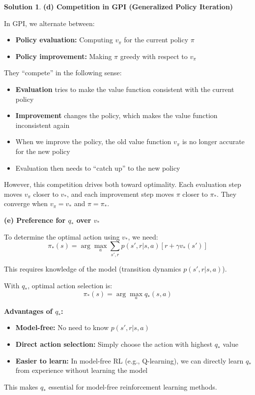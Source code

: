 \documentclass[11pt]{article}
\theoremstyle{definition}
\newtheorem*{solution}{Solution}
\begin{document}
\begin{solution}
\textbf{(d) Competition in GPI (Generalized Policy Iteration)}

In GPI, we alternate between:
\begin{itemize}
    \item \textbf{Policy evaluation:} Computing $v_\pi$ for the current policy $\pi$
    \item \textbf{Policy improvement:} Making $\pi$ greedy with respect to $v_\pi$
\end{itemize}

They ``compete'' in the following sense:
\begin{itemize}
    \item \textbf{Evaluation} tries to make the value function consistent with the current policy
    \item \textbf{Improvement} changes the policy, which makes the value function inconsistent again
    \item When we improve the policy, the old value function $v_\pi$ is no longer accurate for the new policy
    \item Evaluation then needs to ``catch up'' to the new policy
\end{itemize}

However, this competition drives both toward optimality. Each evaluation step moves $v_\pi$ closer to $v_*$, and each improvement step moves $\pi$ closer to $\pi_*$. They converge when $v_\pi = v_*$ and $\pi = \pi_*$.

\textbf{(e) Preference for $q_*$ over $v_*$}

To determine the optimal action using $v_*$, we need:
\[
\pi_*(s) = \arg\max_a \sum_{s',r} p(s',r|s,a)[r + \gamma v_*(s')]
\]

This requires knowledge of the model (transition dynamics $p(s',r|s,a)$).

With $q_*$, optimal action selection is:
\[
\pi_*(s) = \arg\max_a q_*(s,a)
\]

\textbf{Advantages of $q_*$:}
\begin{itemize}
    \item \textbf{Model-free:} No need to know $p(s',r|s,a)$
    \item \textbf{Direct action selection:} Simply choose the action with highest $q_*$ value
    \item \textbf{Easier to learn:} In model-free RL (e.g., Q-learning), we can directly learn $q_*$ from experience without learning the model
\end{itemize}

This makes $q_*$ essential for model-free reinforcement learning methods.
\end{solution}
\end{document}
